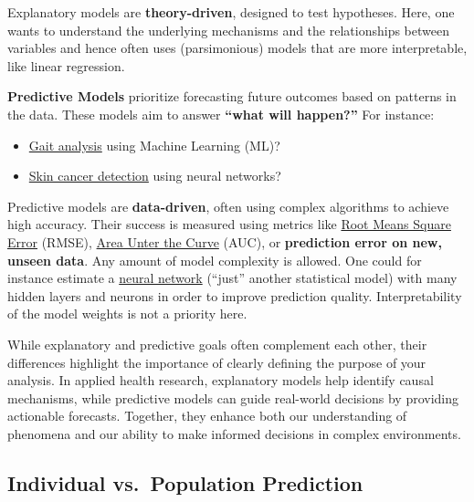 \documentclass[
]{book}
\providecommand{\tightlist}{%
  \setlength{\itemsep}{0pt}\setlength{\parskip}{0pt}}
\begin{document}
Explanatory models are \textbf{theory-driven}, designed to test hypotheses. Here, one wants to understand the underlying
mechanisms and the relationships between variables and hence often uses (parsimonious) models that are more interpretable,
like linear regression.

\textbf{Predictive Models} prioritize forecasting future outcomes based on patterns in the data.
These models aim to answer \textbf{``what will happen?''} For instance:

\begin{itemize}
\tightlist
\item
  \href{https://www.tandfonline.com/doi/abs/10.1080/03091902.2020.1822940}{Gait analysis} using Machine Learning (ML)?
\item
  \href{https://jamanetwork.com/journals/jamadermatology/fullarticle/2756346}{Skin cancer detection} using neural networks?
\end{itemize}

Predictive models are \textbf{data-driven}, often using complex algorithms to achieve high accuracy.
Their success is measured using metrics like \href{https://computersciencewiki.org/index.php/Root-mean-square_error_(RMSE)}{Root Means Square Error}
(RMSE), \href{https://en.wikipedia.org/wiki/Receiver_operating_characteristic\#:~:text=The\%20area\%20under\%20the\%20curve,ranks\%20higher\%20than\%20'negative'}{Area Unter the Curve}
(AUC), or \textbf{prediction error on new, unseen data}.
Any amount of model complexity is allowed. One could for instance estimate a
\href{https://en.wikipedia.org/wiki/Neural_network_(machine_learning)}{neural network} (``just'' another statistical model)
with many hidden layers and neurons in order to improve prediction quality. Interpretability of the model weights is not a priority here.

While explanatory and predictive goals often complement each other,
their differences highlight the importance of clearly defining the purpose
of your analysis. In applied health research, explanatory models help identify
causal mechanisms, while predictive models can guide real-world decisions by
providing actionable forecasts. Together, they enhance both our understanding
of phenomena and our ability to make informed decisions in complex environments.

\subsection{Individual vs.~Population Prediction}\label{individual-vs.-population-prediction}
\end{document}
